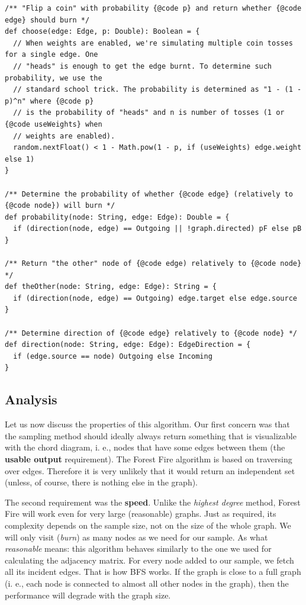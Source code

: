 \begin{verbatim}
/** "Flip a coin" with probability {@code p} and return whether {@code edge} should burn */
def choose(edge: Edge, p: Double): Boolean = {
  // When weights are enabled, we're simulating multiple coin tosses for a single edge. One
  // "heads" is enough to get the edge burnt. To determine such probability, we use the
  // standard school trick. The probability is determined as "1 - (1 - p)^n" where {@code p}
  // is the probability of "heads" and n is number of tosses (1 or {@code useWeights} when
  // weights are enabled).
  random.nextFloat() < 1 - Math.pow(1 - p, if (useWeights) edge.weight else 1)
}

/** Determine the probability of whether {@code edge} (relatively to {@code node}) will burn */
def probability(node: String, edge: Edge): Double = {
  if (direction(node, edge) == Outgoing || !graph.directed) pF else pB
}

/** Return "the other" node of {@code edge) relatively to {@code node} */
def theOther(node: String, edge: Edge): String = {
  if (direction(node, edge) == Outgoing) edge.target else edge.source
}

/** Determine direction of {@code edge} relatively to {@code node} */
def direction(node: String, edge: Edge): EdgeDirection = {
  if (edge.source == node) Outgoing else Incoming
}
\end{verbatim}

\subsection{Analysis}

Let us now discuss the properties of this algorithm. Our first concern was that the sampling method should ideally always return something that is visualizable with the chord diagram, i. e., nodes that have some edges between them (the \textbf{usable output} requirement). The  Forest Fire algorithm is based on traversing over edges. Therefore it is very unlikely that it would return an independent set (unless, of course, there is nothing else in the graph).

The second requirement was the \textbf{speed}. Unlike the \emph{highest degree} method, Forest Fire will work even for very large (reasonable) graphs. Just as required, its complexity depends on the sample size, not on the size of the whole graph. We will only visit (\emph{burn}) as many nodes as we need for our sample. As what \emph{reasonable} means: this algorithm behaves similarly to the one we used for calculating the adjacency matrix. For every node added to our sample, we fetch all its incident edges. That is how BFS works. If the graph is close to a full graph (i. e., each node is connected to almost all other nodes in the graph), then the performance will degrade with the graph size.

